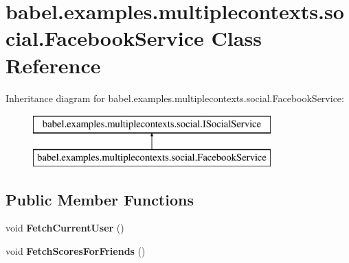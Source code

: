 \hypertarget{classbabel_1_1examples_1_1multiplecontexts_1_1social_1_1_facebook_service}{\section{babel.\-examples.\-multiplecontexts.\-social.\-Facebook\-Service Class Reference}
\label{classbabel_1_1examples_1_1multiplecontexts_1_1social_1_1_facebook_service}
}
Inheritance diagram for babel.\-examples.\-multiplecontexts.\-social.\-Facebook\-Service\-:\begin{figure}[H]
\begin{center}
\leavevmode
\includegraphics[height=2.000000cm]{classbabel_1_1examples_1_1multiplecontexts_1_1social_1_1_facebook_service}
\end{center}
\end{figure}
\subsection*{Public Member Functions}
\begin{DoxyCompactItemize}
\item 
\hypertarget{classbabel_1_1examples_1_1multiplecontexts_1_1social_1_1_facebook_service_a3370e9bada5f397b87a86c97b572cf0d}{void {\bfseries Fetch\-Current\-User} ()}\label{classbabel_1_1examples_1_1multiplecontexts_1_1social_1_1_facebook_service_a3370e9bada5f397b87a86c97b572cf0d}

\item 
\hypertarget{classbabel_1_1examples_1_1multiplecontexts_1_1social_1_1_facebook_service_a2fa3b7f9b81632f08d32729a85cb6293}{void {\bfseries Fetch\-Scores\-For\-Friends} ()}\label{classbabel_1_1examples_1_1multiplecontexts_1_1social_1_1_facebook_service_a2fa3b7f9b81632f08d32729a85cb6293}

\end{DoxyCompactItemize}

